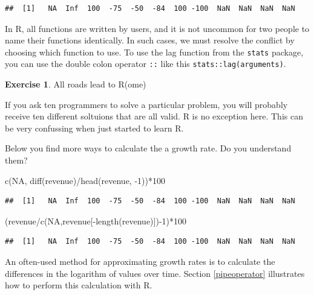 \documentclass[
  12pt,
  oneside]{book}
\newenvironment{Shaded}{\begin{snugshade}}{\end{snugshade}}
\newcommand{\ConstantTok}[1]{\textcolor[rgb]{0.00,0.00,0.00}{#1}}
\newcommand{\DecValTok}[1]{\textcolor[rgb]{0.00,0.00,0.81}{#1}}
\newcommand{\FunctionTok}[1]{\textcolor[rgb]{0.00,0.00,0.00}{#1}}
\newcommand{\NormalTok}[1]{#1}
\newcommand{\SpecialCharTok}[1]{\textcolor[rgb]{0.00,0.00,0.00}{#1}}
\theoremstyle{definition}
\theoremstyle{definition}
\theoremstyle{definition}
\newtheorem{exercise}{Exercise}[chapter]
\theoremstyle{definition}
\theoremstyle{remark}
\begin{document}
\begin{verbatim}
##  [1]   NA  Inf  100  -75  -50  -84  100 -100  NaN  NaN  NaN  NaN
\end{verbatim}

In R, all functions are written by users, and it is not uncommon for two people to name their functions identically. In such cases, we must resolve the conflict by choosing which function to use. To use the lag function from the \texttt{stats} package, you can use the double colon operator \texttt{::} like this \texttt{stats::lag(arguments)}.

\begin{exercise}
\protect\hypertarget{exr:growthrate}{}\label{exr:growthrate}All roads lead to R(ome)

If you ask ten programmers to solve a particular problem, you will probably receive ten different soltuions that are all valid. R is no exception here. This can be very confussing when just started to learn R.

Below you find more ways to calculate the a growth rate. Do you understand them?

\begin{Shaded}
\begin{Highlighting}[]
\FunctionTok{c}\NormalTok{(}\ConstantTok{NA}\NormalTok{, }\FunctionTok{diff}\NormalTok{(revenue)}\SpecialCharTok{/}\FunctionTok{head}\NormalTok{(revenue, }\SpecialCharTok{{-}}\DecValTok{1}\NormalTok{))}\SpecialCharTok{*}\DecValTok{100}        
\end{Highlighting}
\end{Shaded}

\begin{verbatim}
##  [1]   NA  Inf  100  -75  -50  -84  100 -100  NaN  NaN  NaN  NaN
\end{verbatim}

\begin{Shaded}
\begin{Highlighting}[]
\NormalTok{(revenue}\SpecialCharTok{/}\FunctionTok{c}\NormalTok{(}\ConstantTok{NA}\NormalTok{,revenue[}\SpecialCharTok{{-}}\FunctionTok{length}\NormalTok{(revenue)])}\SpecialCharTok{{-}}\DecValTok{1}\NormalTok{)}\SpecialCharTok{*}\DecValTok{100}
\end{Highlighting}
\end{Shaded}

\begin{verbatim}
##  [1]   NA  Inf  100  -75  -50  -84  100 -100  NaN  NaN  NaN  NaN
\end{verbatim}

An often-used method for approximating growth rates is to calculate the differences in the logarithm of values over time. Section \ref{pipeoperator} illustrates how to perform this calculation with R.
\end{exercise}
\end{document}
